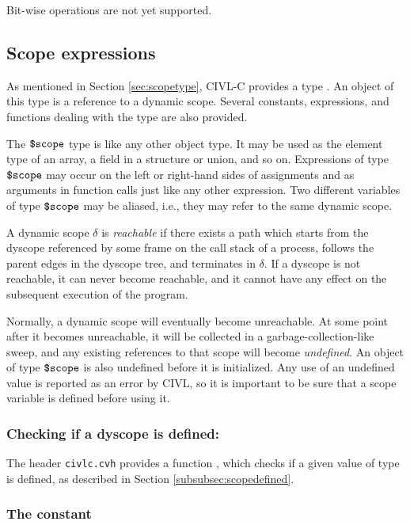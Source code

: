 Bit-wise operations are not yet supported.

\subsection{Scope expressions}
\label{sec:scopeexpr}

As mentioned in Section \ref{sec:scopetype}, CIVL-C provides a type
\cscope.  An object of this type is a reference to a dynamic scope.
Several constants, expressions, and functions dealing with the
\cscope{} type are also provided.

The $\mbox{\texttt{\${}scope}}$ type is like any other object type.  It may be used as
the element type of an array, a field in a structure or union, and so
on.  Expressions of type $\mbox{\texttt{\${}scope}}$ may occur on the left or right-hand
sides of assignments and as arguments in function calls just like any
other expression.  Two different variables of type $\mbox{\texttt{\${}scope}}$ may be
aliased, i.e., they may refer to the same dynamic scope.

A dynamic scope $\delta$ is \emph{reachable} if there exists a path
which starts from the dyscope referenced by some frame on the call
stack of a process, follows the parent edges in the dyscope tree, and
terminates in $\delta$.  If a dyscope is not reachable, it can never
become reachable, and it cannot have any effect on the subsequent
execution of the program.

Normally, a dynamic scope will eventually become unreachable.  At some
point after it becomes unreachable, it will be collected in a
garbage-collection-like sweep, and any existing references to that
scope will become \emph{undefined}.  An object of type $\mbox{\texttt{\${}scope}}$ is
also undefined before it is initialized.  Any use of an undefined
value is reported as an error by CIVL, so it is important to be sure
that a scope variable is defined before using it.


\subsubsection{Checking if a dyscope is defined: \cscopedefined}

The header \texttt{civlc.cvh} provides a function \cscopedefined{}, which checks if a given 
value of \cscope{} type is defined, as described in Section \ref{subsubsec:scopedefined}.

\subsubsection{The constant \chere}

